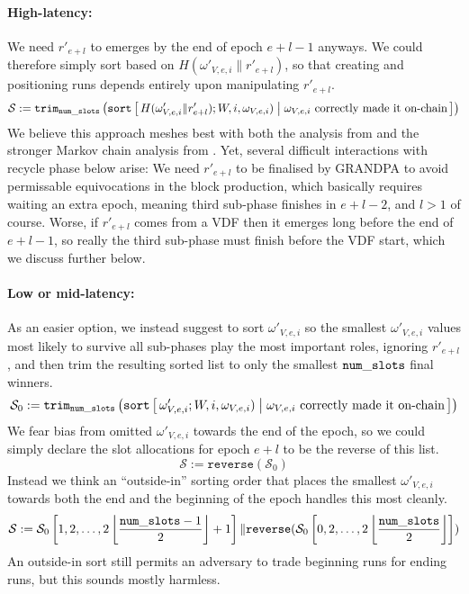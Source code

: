 \paragraph{High-latency:} 
We need $r'_{e+l}$ to emerges by the end of epoch $e+l-1$ anyways.  We could therefore simply sort based on $H(\omega'_{V,e,i} \| r'_{e+l})$, so that creating and positioning runs depends entirely upon manipulating $r'_{e+l}$. 
$$ \mathcal{S} := \mathtt{trim}_\vrfaslotsbound\left( \mathtt{sort} \Listst{
  H(\omega'_{V,e,i} \| r'_{e+l}); W,i,\omega_{V,e,i}) 
}{
  \omega_{V,e,i} \text{ correctly made it on-chain}
} \right) $$
We believe this approach meshes best with both the analysis from \cite{Praos} and the stronger Markov chain analysis from \cite{Kiffer18}.  Yet, several difficult interactions with recycle phase below arise:  We need $r'_{e+l}$ to be finalised by GRANDPA to avoid permissable equivocations in the block production, which basically requires waiting an extra epoch, meaning third sub-phase finishes in $e+l-2$, and $l>1$ of course.  Worse, if $r'_{e+l}$ comes from a VDF then it emerges long before the end of $e+l-1$, so really the third sub-phase must finish before the VDF start, which we discuss further below.

\paragraph{Low or mid-latency:} 
As an easier option, we instead suggest to sort $\omega'_{V,e,i}$ so the smallest $\omega'_{V,e,i}$ values most likely to survive all sub-phases play the most important roles, ignoring $r'_{e+l}$, and then trim the resulting sorted list to only the smallest $\mathtt{num\_slots}$ final winners. 
$$ 
\mathcal{S}_0 := \mathtt{trim}_\vrfaslotsbound \left( 
\mathtt{sort} \Listst{
  \omega'_{V,e,i}; W,i,\omega_{V,e,i}) 
}{
  \omega_{V,e,i} \text{ correctly made it on-chain} %
} \right) 
$$
We fear bias from omitted $\omega'_{V,e,i}$ towards the end of the epoch, so we could simply declare the slot allocations for epoch $e+l$ to be the reverse of this list.
$$ \mathcal{S} := \mathtt{reverse}( \mathcal{S}_0 )$$
Instead we think an ``outside-in'' sorting order that places the smallest $\omega'_{V,e,i}$ towards both the end and the beginning of the epoch handles this most cleanly.
$$ 
\mathcal{S} := 
  \mathcal{S}_0 \left[ 1,2,\ldots, 2 \left\lfloor {\mathtt{num\_slots}-1 \over 2} \right\rfloor + 1 \right]
\|
  \mathtt{reverse}( \mathcal{S}_0 \left[ 0,2,\ldots, 2 \left\lfloor {\mathtt{num\_slots}\over 2} \right\rfloor \right] )
$$
An outside-in sort still permits an adversary to trade beginning runs for ending runs, but this sounds mostly harmless.

